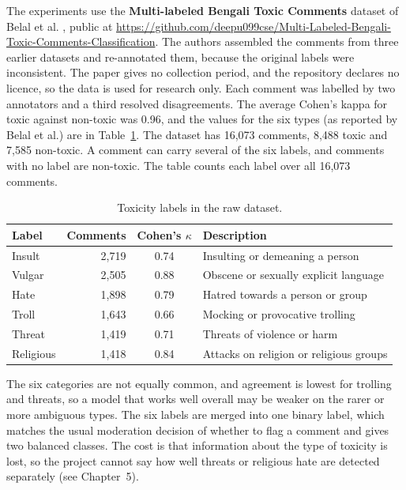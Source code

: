 The experiments use the \textbf{Multi-labeled Bengali Toxic Comments} dataset of Belal et al. \cite{belal2023toxic}, public at \url{https://github.com/deepu099cse/Multi-Labeled-Bengali-Toxic-Comments-Classification}. The authors assembled the comments from three earlier datasets and re-annotated them, because the original labels were inconsistent. The paper gives no collection period, and the repository declares no licence, so the data is used for research only. Each comment was labelled by two annotators and a third resolved disagreements. The average Cohen's kappa for toxic against non-toxic was 0.96, and the values for the six types (as reported by Belal et al.) are in Table~\ref{tab:rawlabels}. The dataset has 16,073 comments, 8,488 toxic and 7,585 non-toxic. A comment can carry several of the six labels, and comments with no label are non-toxic. The table counts each label over all 16,073 comments.

\begin{table}[H]
  \centering
  \caption[Toxicity labels and annotator agreement]{Toxicity labels in the raw dataset.}
  \label{tab:rawlabels}
  \small
  \begin{tabular}{lrcl}
    \toprule
    \textbf{Label} & \textbf{Comments} & \textbf{Cohen's $\kappa$} & \textbf{Description} \\
    \midrule
    Insult    & 2,719 & 0.74 & Insulting or demeaning a person \\
    Vulgar    & 2,505 & 0.88 & Obscene or sexually explicit language \\
    Hate      & 1,898 & 0.79 & Hatred towards a person or group \\
    Troll     & 1,643 & 0.66 & Mocking or provocative trolling \\
    Threat    & 1,419 & 0.71 & Threats of violence or harm \\
    Religious & 1,418 & 0.84 & Attacks on religion or religious groups \\
    \bottomrule
  \end{tabular}
\end{table}

The six categories are not equally common, and agreement is lowest for trolling and threats, so a model that works well overall may be weaker on the rarer or more ambiguous types. The six labels are merged into one binary label, which matches the usual moderation decision of whether to flag a comment and gives two balanced classes. The cost is that information about the type of toxicity is lost, so the project cannot say how well threats or religious hate are detected separately (see Chapter~5).

